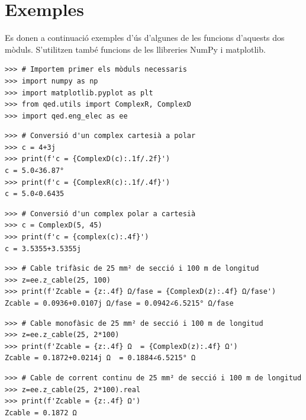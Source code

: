 


\section{Exemples}\label{sec:exemples-qed}
Es donen a continuació  exemples d'ús d'algunes de les funcions d'aquests dos mòduls. S'utilitzen també funcions de les llibreries NumPy i  matplotlib.

\begin{lstlisting}
>>> # Importem primer els mòduls necessaris
>>> import numpy as np
>>> import matplotlib.pyplot as plt
>>> from qed.utils import ComplexR, ComplexD
>>> import qed.eng_elec as ee
\end{lstlisting}

\begin{lstlisting}
>>> # Conversió d'un complex cartesià a polar
>>> c = 4+3j
>>> print(f'c = {ComplexD(c):.1f/.2f}')
c = 5.0∠36.87°
>>> print(f'c = {ComplexR(c):.1f/.4f}')
c = 5.0∠0.6435
\end{lstlisting} 

\begin{lstlisting}
>>> # Conversió d'un complex polar a cartesià
>>> c = ComplexD(5, 45)
>>> print(f'c = {complex(c):.4f}')
c = 3.5355+3.5355j
\end{lstlisting}

\begin{lstlisting}
>>> # Cable trifàsic de 25 mm² de secció i 100 m de longitud
>>> z=ee.z_cable(25, 100)
>>> print(f'Zcable = {z:.4f} Ω/fase = {ComplexD(z):.4f} Ω/fase')
Zcable = 0.0936+0.0107j Ω/fase = 0.0942∠6.5215° Ω/fase	
\end{lstlisting} 

\begin{lstlisting}
>>> # Cable monofàsic de 25 mm² de secció i 100 m de longitud
>>> z=ee.z_cable(25, 2*100)
>>> print(f'Zcable = {z:.4f} Ω  = {ComplexD(z):.4f} Ω')
Zcable = 0.1872+0.0214j Ω  = 0.1884∠6.5215° Ω	
\end{lstlisting}

\begin{lstlisting}
>>> # Cable de corrent continu de 25 mm² de secció i 100 m de longitud
>>> z=ee.z_cable(25, 2*100).real
>>> print(f'Zcable = {z:.4f} Ω')
Zcable = 0.1872 Ω	
\end{lstlisting}

